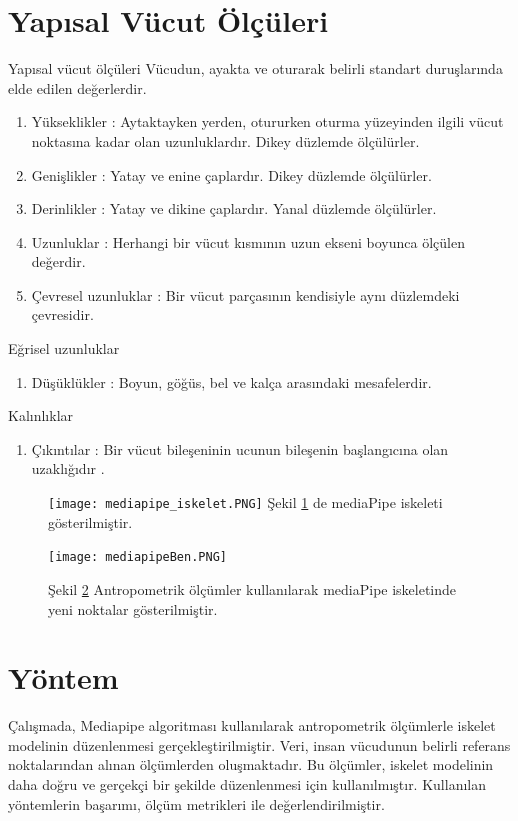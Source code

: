 \documentclass[12pt, a4paper]{article}
\begin{document}
\section{Yapısal Vücut Ölçüleri}
Yapısal vücut ölçüleri
Vücudun, ayakta ve oturarak belirli standart duruşlarında elde edilen değerlerdir.
\begin{enumerate}
	\item  Yükseklikler : Aytaktayken yerden, otururken oturma yüzeyinden ilgili vücut noktasına kadar olan uzunluklardır.  Dikey düzlemde ölçülürler.
	\item Genişlikler : Yatay ve enine çaplardır. Dikey düzlemde ölçülürler.
	\item Derinlikler : Yatay ve dikine çaplardır. Yanal düzlemde ölçülürler.
	\item Uzunluklar : Herhangi bir vücut kısmının uzun ekseni boyunca ölçülen değerdir.
	\item Çevresel uzunluklar : Bir vücut parçasının kendisiyle aynı düzlemdeki çevresidir.
\end{enumerate}
Eğrisel uzunluklar
\begin{enumerate}
	\item Düşüklükler : Boyun, göğüs, bel ve kalça arasındaki mesafelerdir.
\end{enumerate}
Kalınlıklar
\begin{enumerate}
	\item Çıkıntılar : Bir vücut bileşeninin ucunun bileşenin başlangıcına olan uzaklığıdır \cite{Antropometrik}.
\end{enumerate}
\newpage
  \begin{figure}[!ht]
	\caption{}
	\centering
	\texttt{[image: mediapipe\_iskelet.PNG]}
	\label{CVZonex}
	Şekil \ref{CVZonex} de mediaPipe iskeleti gösterilmiştir\cite{MediapipeGithubb}.	
	
	
	
\end{figure}
\newpage
\begin{figure}[!ht]
	\caption{}
	\centering
	\texttt{[image: mediapipeBen.PNG]}
	\label{mediapipeBen}
	
	
	Şekil \ref{mediapipeBen} Antropometrik ölçümler kullanılarak mediaPipe iskeletinde yeni noktalar gösterilmiştir.	
	
	
	\newpage
\end{figure}

\section{Yöntem}
Çalışmada, Mediapipe algoritması kullanılarak antropometrik ölçümlerle iskelet modelinin düzenlenmesi gerçekleştirilmiştir. Veri, insan vücudunun belirli referans noktalarından alınan ölçümlerden oluşmaktadır. Bu ölçümler, iskelet modelinin daha doğru ve gerçekçi bir şekilde düzenlenmesi için kullanılmıştır. Kullanılan yöntemlerin başarımı, ölçüm metrikleri ile değerlendirilmiştir.
\newpage
\end{document}
